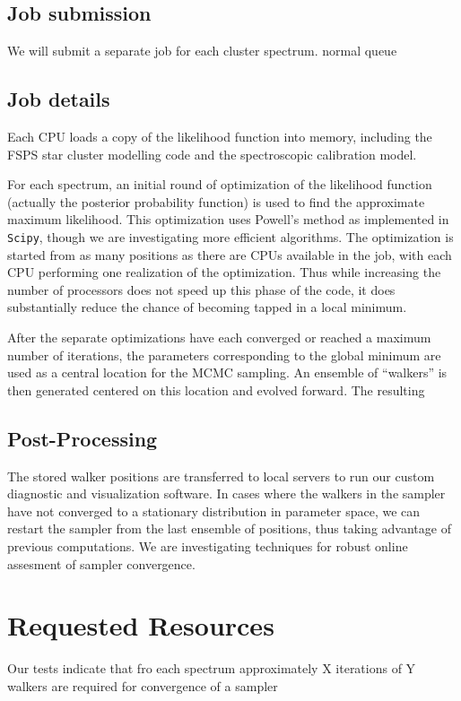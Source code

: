 \documentclass[11pt,preprint]{aastex}
\begin{document}
\subsection{Job submission}
We will submit a separate job for each cluster spectrum. normal queue

\subsection{Job details}
Each CPU loads a copy of the likelihood function into memory,
including the FSPS star cluster modelling code and the spectroscopic
calibration model.

For each spectrum, an initial round of optimization of the likelihood
function (actually the posterior probability function) is used to find
the approximate maximum likelihood. This optimization uses Powell's
method as implemented in \texttt{Scipy}, though we are investigating
more efficient algorithms. The optimization is started from as many
positions as there are CPUs available in the job, with each CPU
performing one realization of the optimization.  Thus while increasing
the number of processors does not speed up this phase of the code, it
does substantially reduce the chance of becoming tapped in a local
minimum.

After the separate optimizations have each converged or reached a
maximum number of iterations, the parameters corresponding to the
global minimum are used as a central location for the MCMC sampling.
An ensemble of ``walkers'' is then generated centered on this location
and evolved forward.  The resulting 

\subsection{Post-Processing}
The stored walker positions are transferred to local servers to run
our custom diagnostic and visualization software.  In cases where the
walkers in the sampler have not converged to a stationary distribution
in parameter space, we can restart the sampler from the last ensemble
of positions, thus taking advantage of previous computations.  We are
investigating techniques for robust online assesment of sampler
convergence.


\section{Requested Resources}
Our tests indicate that fro each spectrum approximately X iterations
of Y walkers are required for convergence of a sampler





\clearpage





\end{document}
